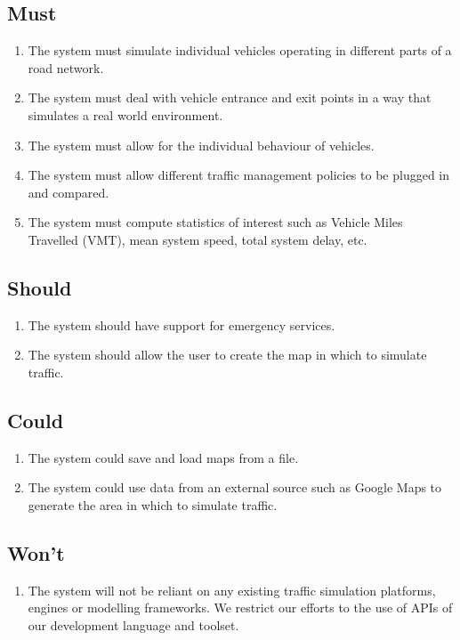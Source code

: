 \documentclass[11pt,a4paper]{article}
\begin{document}
\subsection{Must}
\label{section:must}
\begin{enumerate}[itemsep=-1ex]
  \item The system must simulate individual vehicles operating in different parts of a road network.
  \item The system must deal with vehicle entrance and exit points in a way that simulates a real world environment.
  \item The system must allow for the individual behaviour of vehicles.
  \item The system must allow different traffic management policies to be plugged in and compared.
  \item The system must compute statistics of interest such as Vehicle Miles Travelled (VMT), mean system speed, total system delay, etc. 
\end{enumerate}

\subsection{Should}
\begin{enumerate}[itemsep=-1ex]
  \item The system should have support for emergency services.
  \item The system should allow the user to create the map in which to simulate traffic.
\end{enumerate}

\subsection{Could}
\begin{enumerate}[itemsep=-1ex]
  \item The system could save and load maps from a file.
  \item The system could use data from an external source such as Google Maps to generate the area in which to simulate traffic.
\end{enumerate}

\subsection{Won't}
\begin{enumerate}[itemsep=-1ex]
  \item The system will not be reliant on any existing traffic simulation platforms, engines or modelling frameworks.  We restrict our efforts to the use of APIs of our development language and toolset.
\end{enumerate}
\end{document}

